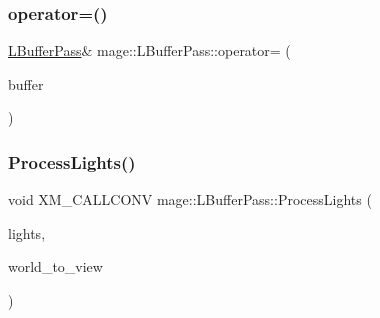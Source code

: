 \hypertarget{structmage_1_1_l_buffer_pass_a3e4405a5af87c2c6f4839cb8502aa5de}{}\label{structmage_1_1_l_buffer_pass_a3e4405a5af87c2c6f4839cb8502aa5de} 
\subsubsection{\texorpdfstring{operator=()}{operator=()}\hspace{0.1cm}{\footnotesize\ttfamily [2/2]}}
{\footnotesize\ttfamily \hyperlink{structmage_1_1_l_buffer_pass}{L\+Buffer\+Pass}\& mage\+::\+L\+Buffer\+Pass\+::operator= (\begin{DoxyParamCaption}\item[{\hyperlink{structmage_1_1_l_buffer_pass}{L\+Buffer\+Pass} \&\&}]{buffer }\end{DoxyParamCaption})\hspace{0.3cm}{\ttfamily [delete]}}

\hypertarget{structmage_1_1_l_buffer_pass_a03341222533877f82ac48b80628c609b}{}\label{structmage_1_1_l_buffer_pass_a03341222533877f82ac48b80628c609b} 
\subsubsection{\texorpdfstring{Process\+Lights()}{ProcessLights()}\hspace{0.1cm}{\footnotesize\ttfamily [1/3]}}
{\footnotesize\ttfamily void X\+M\+\_\+\+C\+A\+L\+L\+C\+O\+NV mage\+::\+L\+Buffer\+Pass\+::\+Process\+Lights (\begin{DoxyParamCaption}\item[{const vector$<$ const \hyperlink{namespacemage_a7637b5351fc0f66a10badd80ebb35899}{Directional\+Light\+Node} $\ast$ $>$ \&}]{lights,  }\item[{F\+X\+M\+M\+A\+T\+R\+IX}]{world\+\_\+to\+\_\+view }\end{DoxyParamCaption})\hspace{0.3cm}{\ttfamily [private]}}

\hypertarget{structmage_1_1_l_buffer_pass_a6d7549bcd083afa625bd257975e041ad}{}\label{structmage_1_1_l_buffer_pass_a6d7549bcd083afa625bd257975e041ad} 
